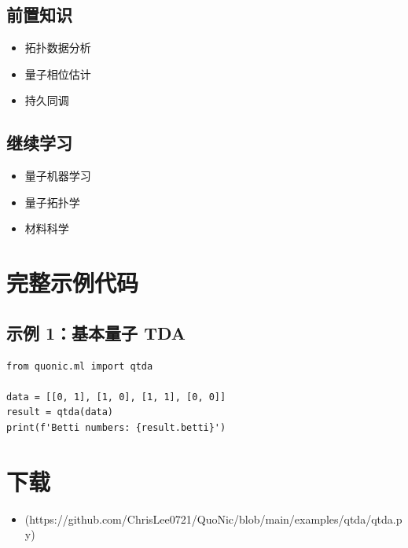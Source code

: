 \documentclass[12pt,a4paper]{article}
\begin{document}
\subsection{前置知识}
\begin{itemize}
  \item 拓扑数据分析
  \item 量子相位估计
  \item 持久同调
\end{itemize}

\subsection{继续学习}
\begin{itemize}
  \item 量子机器学习
  \item 量子拓扑学
  \item 材料科学
\end{itemize}

\section{完整示例代码}

\subsection{示例 1：基本量子 TDA}

\begin{verbatim}
from quonic.ml import qtda

data = [[0, 1], [1, 0], [1, 1], [0, 0]]
result = qtda(data)
print(f'Betti numbers: {result.betti}')
\end{verbatim}

\section{下载}

\begin{itemize}
  \item [qtda.py](https://github.com/ChrisLee0721/QuoNic/blob/main/examples/qtda/qtda.py)
\end{itemize}
\end{document}
